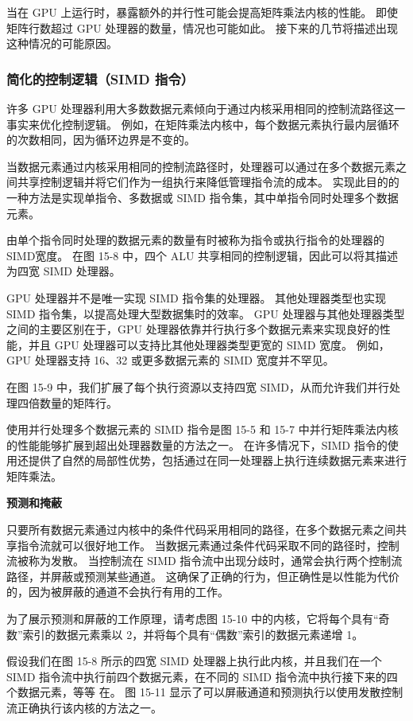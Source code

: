 当在 GPU 上运行时，暴露额外的并行性可能会提高矩阵乘法内核的性能。 即使矩阵行数超过 GPU 处理器的数量，情况也可能如此。 接下来的几节将描述出现这种情况的可能原因。

\subsubsection{简化的控制逻辑（SIMD 指令）}
许多 GPU 处理器利用大多数数据元素倾向于通过内核采用相同的控制流路径这一事实来优化控制逻辑。 例如，在矩阵乘法内核中，每个数据元素执行最内层循环的次数相同，因为循环边界是不变的。

当数据元素通过内核采用相同的控制流路径时，处理器可以通过在多个数据元素之间共享控制逻辑并将它们作为一组执行来降低管理指令流的成本。 实现此目的的一种方法是实现单指令、多数据或 SIMD 指令集，其中单指令同时处理多个数据元素。

由单个指令同时处理的数据元素的数量有时被称为指令或执行指令的处理器的SIMD宽度。 在图 15-8 中，四个 ALU 共享相同的控制逻辑，因此可以将其描述为四宽 SIMD 处理器。

GPU 处理器并不是唯一实现 SIMD 指令集的处理器。 其他处理器类型也实现 SIMD 指令集，以提高处理大型数据集时的效率。 GPU 处理器与其他处理器类型之间的主要区别在于，GPU 处理器依靠并行执行多个数据元素来实现良好的性能，并且 GPU 处理器可以支持比其他处理器类型更宽的 SIMD 宽度。 例如，GPU 处理器支持 16、32 或更多数据元素的 SIMD 宽度并不罕见。

在图 15-9 中，我们扩展了每个执行资源以支持四宽 SIMD，从而允许我们并行处理四倍数量的矩阵行。

使用并行处理多个数据元素的 SIMD 指令是图 15-5 和 15-7 中并行矩阵乘法内核的性能能够扩展到超出处理器数量的方法之一。 在许多情况下，SIMD 指令的使用还提供了自然的局部性优势，包括通过在同一处理器上执行连续数据元素来进行矩阵乘法。

\textbf{预测和掩蔽}

只要所有数据元素通过内核中的条件代码采用相同的路径，在多个数据元素之间共享指令流就可以很好地工作。 当数据元素通过条件代码采取不同的路径时，控制流被称为发散。 当控制流在 SIMD 指令流中出现分歧时，通常会执行两个控制流路径，并屏蔽或预测某些通道。 这确保了正确的行为，但正确性是以性能为代价的，因为被屏蔽的通道不会执行有用的工作。

为了展示预测和屏蔽的工作原理，请考虑图 15-10 中的内核，它将每个具有“奇数”索引的数据元素乘以 2，并将每个具有“偶数”索引的数据元素递增 1。

假设我们在图 15-8 所示的四宽 SIMD 处理器上执行此内核，并且我们在一个 SIMD 指令流中执行前四个数据元素，在不同的 SIMD 指令流中执行接下来的四个数据元素，等等 在。 图 15-11 显示了可以屏蔽通道和预测执行以使用发散控制流正确执行该内核的方法之一。

